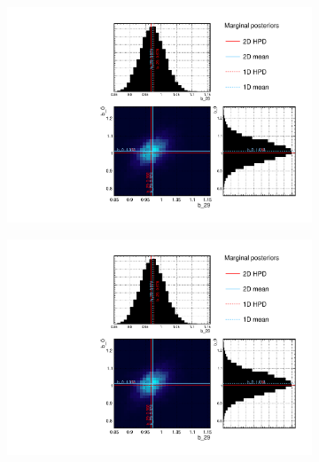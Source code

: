\begin{figure}[h]
	\begin{subfigure}[t]{0.24\textwidth}
		\includegraphics[width=\textwidth, trim={0mm 0mm 0mm 0mm}, clip,page=25]{figures/mach3/mcmc/2017b_NewDet_3Xsec_4Det_5Flux_NewXSecTune_Asimov_merge_b29}
	\end{subfigure}
	\begin{subfigure}[t]{0.24\textwidth}
		\includegraphics[width=\textwidth, trim={0mm 0mm 0mm 0mm}, clip,page=47]{figures/mach3/mcmc/2017b_NewDet_3Xsec_4Det_5Flux_NewXSecTune_Asimov_merge_b29}
	\end{subfigure}
	\begin{subfigure}[t]{0.24\textwidth}

\end{subfigure}
\end{figure}
